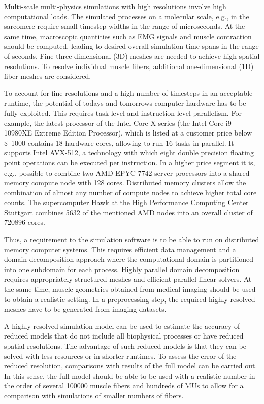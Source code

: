 Multi-scale multi-physics simulations with high resolutions involve high computational loads. The simulated processes on a molecular scale, e.g., in the sarcomere require small timestep widths in the range of microseconds. At the same time, macroscopic quantities such as EMG signals and muscle contraction should be computed, leading to desired overall simulation time spans in the range of seconds.
Fine three-dimensional (3D) meshes are needed to achieve high spatial resolutions. To resolve individual muscle fibers, additional one-dimensional (1D) fiber meshes are considered.

To account for fine resolutions and a high number of timesteps in an acceptable runtime, the potential of todays and tomorrows computer hardware has to be fully exploited. This requires task-level and instruction-level parallelism. For example, the latest processor of the Intel Core X series (the Intel Core i9-10980XE Extreme Edition Processor), which is listed at a customer price below \SI{1000}[\$]{} contains 18 hardware cores, allowing to run 16 tasks in parallel. It supports Intel AVX-512, a technology with which eight double precision floating point operations can be executed per instruction. 
In a higher price segment it is, e.g., possible to combine two AMD EPYC 7742 server processors into a shared memory compute node with \num{128} cores. Distributed memory clusters allow the combination of almost any number of compute nodes to achieve higher total core counts. The supercomputer Hawk at the High Performance Computing Center Stuttgart combines \num{5632} of the mentioned AMD nodes into an overall cluster of \num{720896} cores.

Thus, a requirement to the simulation software is to be able to run on distributed memory computer systems. This requires efficient data management and a domain decomposition approach where the computational domain is partitioned into one subdomain for each process.
Highly parallel domain decomposition requires appropriately structured meshes and efficient parallel linear solvers. At the same time, muscle geometries obtained from medical imaging should be used to obtain a realistic setting. In a preprocessing step, the required highly resolved meshes have to be generated from imaging datasets.

A highly resolved simulation model can be used to estimate the accuracy of reduced models that do not include all biophysical processes or have reduced spatial resolutions. The advantage of such reduced models is that they can be solved with less resources or in shorter runtimes. To assess the error of the reduced resolution, comparisons with results of the full model can be carried out. In this sense, the full model should be able to be used with a realistic number in the order of several \num{100000} muscle fibers and hundreds of MUs to allow for a comparison with simulations of smaller numbers of fibers.

